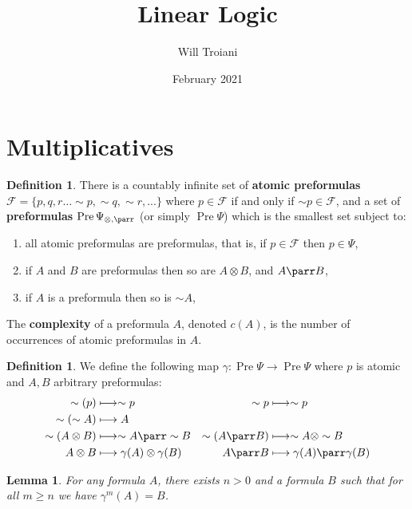 \documentclass[12pt]{article}
\title{Linear Logic}
\author{Will Troiani}
\date{February 2021}
\theoremstyle{plain}
\newtheorem{lemma}[thm]{Lemma}
\theoremstyle{definition}
\newtheorem{defn}[thm]{Definition} %
\newcommand{\scr}[1]{\mathscr{#1}}
\newcommand{\lto}{\longrightarrow}
\newcommand{\negation}{\sim}
\begin{document}
\maketitle
\tableofcontents
\section{Multiplicatives}
\begin{defn}\label{def:formulas}
There is a countably infinite set of \textbf{atomic preformulas} $\scr{F} = \lbrace p,q,r\hdots \negation p, \negation q, \negation r,...\rbrace$ where $p \in \scr{F}$ if and only if $\negation p \in \scr{F}$, and a set of \textbf{preformulas} $\operatorname{Pre}\Psi_{\otimes,\parr}$ (or simply $\operatorname{Pre}\Psi$) which is the smallest set subject to:
\begin{enumerate}
    \item all atomic preformulas are preformulas, that is, if $p \in \scr{F}$ then $p \in \Psi$,
    \item if $A$ and $B$ are preformulas then so are $A \otimes B$, and $A \parr B$,
    \item\label{def:formulas_negation} if $A$ is a preformula then so is $\sim A$,
\end{enumerate}
The \textbf{complexity} of a preformula $A$, denoted $c(A)$, is the number of occurrences of atomic preformulas in $A$.
\end{defn}
\begin{defn}\label{def:negation_normal_map}
We define the following map $\gamma: \operatorname{Pre}\Psi \lto \operatorname{Pre}\Psi$ where $p$ is atomic and $A,B$ arbitrary preformulas:
\begin{align*}
    \negation (p) &\longmapsto \negation p & \negation p &\longmapsto \negation p\\
    \negation (\negation A) &\longmapsto A \\
    \negation (A \otimes B) &\longmapsto \negation A \parr \negation B & \negation (A \parr B) &\longmapsto \negation A \otimes \negation B\\
    A \otimes B &\longmapsto \gamma(A) \otimes \gamma(B) & A \parr B &\longmapsto \gamma(A) \parr \gamma(B)
\end{align*}
\end{defn}
\begin{lemma}\label{lem:negation_normal_form}
For any formula $A$, there exists $n > 0$ and a formula $B$ such that for all $m \ge n$ we have $\gamma^m(A) = B$.
\end{lemma}
\end{document}
